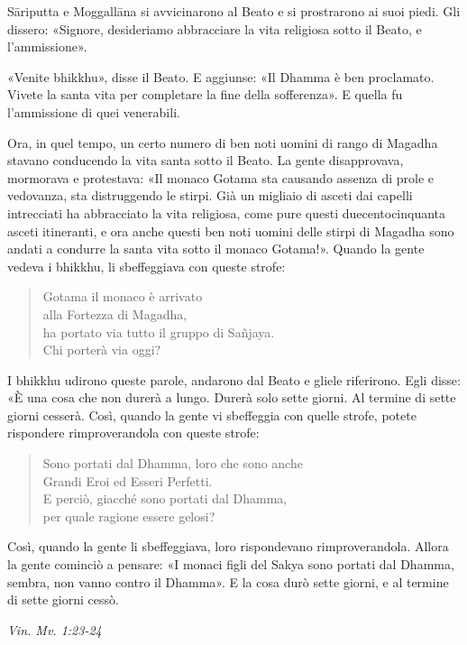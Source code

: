Sāriputta e Moggallāna si avvicinarono al Beato e si prostrarono ai suoi
piedi. Gli dissero: «Signore, desideriamo abbracciare la vita religiosa
sotto il Beato, e l’ammissione».


«Venite bhikkhu», disse il Beato. E aggiunse: «Il Dhamma è ben
proclamato. Vivete la santa vita per completare la fine della
sofferenza». E quella fu l’ammissione di quei venerabili.


Ora, in quel tempo, un certo numero di ben noti uomini di rango di
Magadha stavano conducendo la vita santa sotto il Beato. La gente
disapprovava, mormorava e protestava: «Il monaco Gotama sta causando
assenza di prole e vedovanza, sta distruggendo le stirpi. Già un
migliaio di asceti dai capelli intrecciati ha abbracciato la vita
religiosa, come pure questi duecentocinquanta asceti itineranti, e ora
anche questi ben noti uomini delle stirpi di Magadha sono andati a
condurre la santa vita sotto il monaco Gotama!». Quando la gente vedeva
i bhikkhu, li sbeffeggiava con queste strofe:


\begin{quote}
Gotama il monaco è arrivato \\
alla Fortezza di Magadha, \\
ha portato via tutto il gruppo di Sañjaya. \\
Chi porterà via oggi?
\end{quote}

I bhikkhu udirono queste parole, andarono dal Beato e gliele riferirono.
Egli disse: «È una cosa che non durerà a lungo. Durerà solo sette
giorni. Al termine di sette giorni cesserà. Così, quando la gente vi
sbeffeggia con quelle strofe, potete rispondere rimproverandola con
queste strofe:


\begin{quote}
Sono portati dal Dhamma, loro che sono anche \\
Grandi Eroi ed Esseri Perfetti. \\
E perciò, giacché sono portati dal Dhamma, \\
per quale ragione essere gelosi?
\end{quote}

Così, quando la gente li sbeffeggiava, loro rispondevano
rimproverandola. Allora la gente cominciò a pensare: «I monaci figli del
Sakya sono portati dal Dhamma, sembra, non vanno contro il Dhamma». E la
cosa durò sette giorni, e al termine di sette giorni cessò.


\emph{Vin. Mv. 1:23-24}


